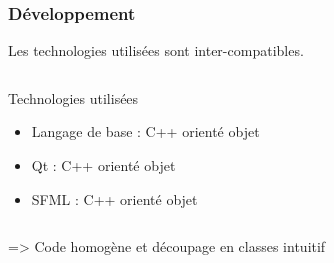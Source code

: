 \begin{frame}
	\frametitle{Développement}
	Les technologies utilisées sont inter-compatibles.
		
	\begin{columns}[t]
		\begin{column}{10cm}
			\begin{exampleblock}{Technologies utilisées}
				\begin{itemize}
					\item Langage de base : C++ orienté objet
					\item Qt : C++ orienté objet
					\item SFML : C++ orienté objet
				\end{itemize}
			\end{exampleblock} 
		\end{column}
	\end{columns}
	
	\bigskip
	
	=> Code homogène et découpage en classes intuitif
\end{frame}